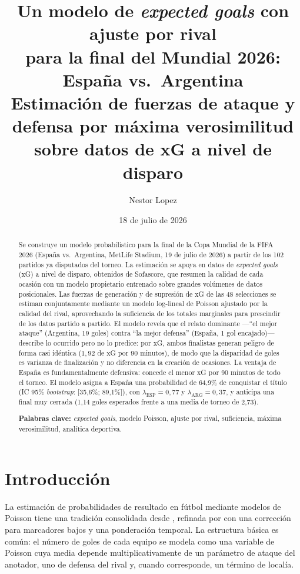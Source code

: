 \documentclass[11pt,a4paper]{article}
\title{\textbf{Un modelo de \textit{expected goals} con ajuste por rival\\ para la final del Mundial 2026: España vs.\ Argentina}\\[0.4em]
\large Estimación de fuerzas de ataque y defensa por máxima verosimilitud\\ sobre datos de xG a nivel de disparo}
\author{Nestor Lopez}
\date{18 de julio de 2026}
\begin{document}
\maketitle

\begin{abstract}
\noindent
Se construye un modelo probabilístico para la final de la Copa Mundial de la FIFA 2026 (España vs.\ Argentina, MetLife Stadium, 19 de julio de 2026) a partir de los 102 partidos ya disputados del torneo. La estimación se apoya en datos de \textit{expected goals} (xG) a nivel de disparo, obtenidos de Sofascore, que resumen la calidad de cada ocasión con un modelo propietario entrenado sobre grandes volúmenes de datos posicionales. Las fuerzas de generación y de supresión de xG de las 48 selecciones se estiman conjuntamente mediante un modelo log-lineal de Poisson ajustado por la calidad del rival, aprovechando la suficiencia de los totales marginales para prescindir de los datos partido a partido. El modelo revela que el relato dominante ---``el mejor ataque'' (Argentina, 19 goles) contra ``la mejor defensa'' (España, 1 gol encajado)--- describe lo ocurrido pero no lo predice: por xG, ambos finalistas generan peligro de forma casi idéntica ($1{,}92$ de xG por 90 minutos), de modo que la disparidad de goles es varianza de finalización y no diferencia en la creación de ocasiones. La ventaja de España es fundamentalmente defensiva: concede el menor xG por 90 minutos de todo el torneo. El modelo asigna a España una probabilidad de 64{,}9\% de conquistar el título (IC 95\% \textit{bootstrap}: [35{,}6\%; 89{,}1\%]), con $\lambda_{\text{ESP}}=0{,}77$ y $\lambda_{\text{ARG}}=0{,}37$, y anticipa una final muy cerrada (1{,}14 goles esperados frente a una media de torneo de 2{,}73).

\smallskip
\noindent\textbf{Palabras clave:} \textit{expected goals}, modelo Poisson, ajuste por rival, suficiencia, máxima verosimilitud, analítica deportiva.
\end{abstract}

\section{Introducción}

La estimación de probabilidades de resultado en fútbol mediante modelos de Poisson tiene una tradición consolidada desde \citet{maher1982}, refinada por \citet{dixoncoles1997} con una corrección para marcadores bajos y una ponderación temporal. La estructura básica es común: el número de goles de cada equipo se modela como una variable de Poisson cuya media depende multiplicativamente de un parámetro de ataque del anotador, uno de defensa del rival y, cuando corresponde, un término de localía.
\end{document}

